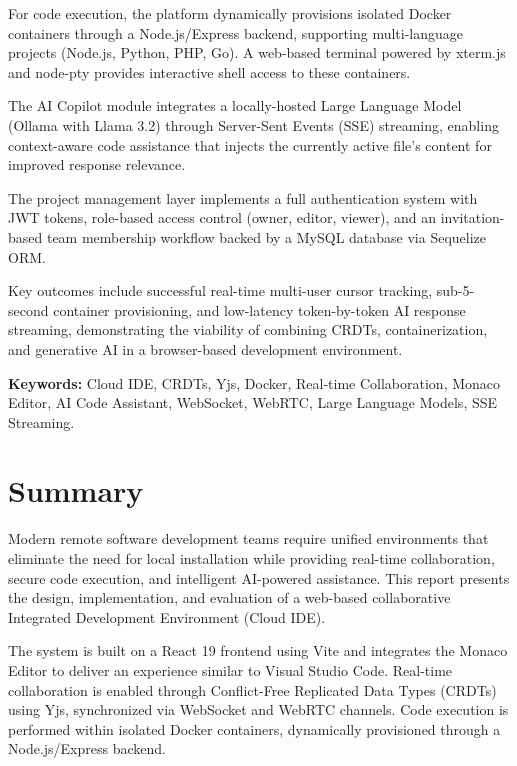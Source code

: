 \documentclass[12pt,a4paper,oneside]{report}
\begin{document}
For code execution, the platform dynamically provisions isolated Docker containers through a Node.js/Express backend, supporting multi-language projects (Node.js, Python, PHP, Go). A web-based terminal powered by xterm.js and node-pty provides interactive shell access to these containers.

The AI Copilot module integrates a locally-hosted Large Language Model (Ollama with Llama 3.2) through Server-Sent Events (SSE) streaming, enabling context-aware code assistance that injects the currently active file's content for improved response relevance.

The project management layer implements a full authentication system with JWT tokens, role-based access control (owner, editor, viewer), and an invitation-based team membership workflow backed by a MySQL database via Sequelize ORM.

Key outcomes include successful real-time multi-user cursor tracking, sub-5-second container provisioning, and low-latency token-by-token AI response streaming, demonstrating the viability of combining CRDTs, containerization, and generative AI in a browser-based development environment.

\vspace{1cm}
\noindent\textbf{Keywords:} Cloud IDE, CRDTs, Yjs, Docker, Real-time Collaboration, Monaco Editor, AI Code Assistant, WebSocket, WebRTC, Large Language Models, SSE Streaming.

\newpage
\chapter*{Summary}

Modern remote software development teams require unified environments that eliminate the need for local installation while providing real-time collaboration, secure code execution, and intelligent AI-powered assistance. This report presents the design, implementation, and evaluation of a web-based collaborative Integrated Development Environment (Cloud IDE).

The system is built on a React 19 frontend using Vite and integrates the Monaco Editor to deliver an experience similar to Visual Studio Code. Real-time collaboration is enabled through Conflict-Free Replicated Data Types (CRDTs) using Yjs, synchronized via WebSocket and WebRTC channels. Code execution is performed within isolated Docker containers, dynamically provisioned through a Node.js/Express backend.
\end{document}
